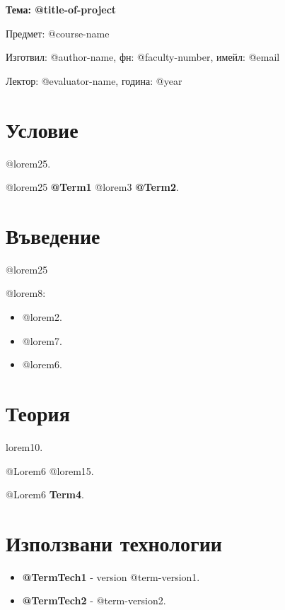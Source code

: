 \documentclass[12pt]{article}
\begin{document}
	\begin{center}
        \LARGE{\textbf{Тема: @title-of-project}}
        
        \bigskip
        \Large{Предмет: @course-name}
        
        \medskip
        \Large{Изготвил: @author-name, фн: @faculty-number, имейл: @email}
        
        \medskip
        \Large{Лектор: @evaluator-name, година: @year}
        
        \bigskip
	\end{center}
    
    
    \tableofcontents
    \bigskip
    \bigskip
    \newpage
  
\section{Условие} 

\noindent @lorem25.

\medskip


\noindent @lorem25  \textbf{@Term1} @lorem3 \textbf{@Term2}.

\section{Въведение}

@lorem25

\noindent @lorem8:

\begin{itemize}
    \item @lorem2.
    
    \item @lorem7.
    
    \item @lorem6.
\end{itemize}

\section{Теория}
\noindent lorem10. 

\medskip

\noindent @Lorem6  @lorem15.

\noindent @Lorem6 \textbf{Term4}.


\section{Използвани технологии}
\begin{itemize}
    \item \textbf{@TermTech1} - version @term-version1.
    
    \item \textbf{@TermTech2} - @term-version2.
\end{itemize}
\end{document}
